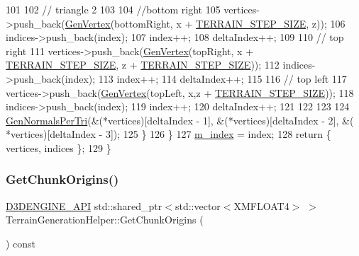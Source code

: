 \begin{DoxyCode}
101 
102             \textcolor{comment}{// triangle 2}
103 
104             \textcolor{comment}{//bottom right}
105             vertices->push\_back(\mbox{\hyperlink{class_terrain_generation_helper_a3ef70fded2f8984224915ec14c1238a7}{GenVertex}}(bottomRight, x + 
      \mbox{\hyperlink{_terrain_generation_helper_8h_ad04a251ab3e1323474688977de1579e4}{TERRAIN\_STEP\_SIZE}}, z));
106             indices->push\_back(index);
107             index++;
108             deltaIndex++;
109             
110             \textcolor{comment}{// top right}
111             vertices->push\_back(\mbox{\hyperlink{class_terrain_generation_helper_a3ef70fded2f8984224915ec14c1238a7}{GenVertex}}(topRight, x + 
      \mbox{\hyperlink{_terrain_generation_helper_8h_ad04a251ab3e1323474688977de1579e4}{TERRAIN\_STEP\_SIZE}}, z + \mbox{\hyperlink{_terrain_generation_helper_8h_ad04a251ab3e1323474688977de1579e4}{TERRAIN\_STEP\_SIZE}}));
112             indices->push\_back(index);
113             index++;
114             deltaIndex++;
115 
116             \textcolor{comment}{// top left}
117             vertices->push\_back(\mbox{\hyperlink{class_terrain_generation_helper_a3ef70fded2f8984224915ec14c1238a7}{GenVertex}}(topLeft, x,z + 
      \mbox{\hyperlink{_terrain_generation_helper_8h_ad04a251ab3e1323474688977de1579e4}{TERRAIN\_STEP\_SIZE}}));
118             indices->push\_back(index);
119             index++;
120             deltaIndex++;
121 
122             
123 
124             \mbox{\hyperlink{class_terrain_generation_helper_a1989d3e408497b90675799ded98feaf1}{GenNormalsPerTri}}(&(*vertices)[deltaIndex - 1], &(*vertices)[deltaIndex - 2], &(
      *vertices)[deltaIndex - 3]);
125         \}
126     \}
127     \mbox{\hyperlink{class_terrain_generation_helper_a225a9ea3488c08d2565efee5461c4d00}{m\_index}} = index;
128     \textcolor{keywordflow}{return} \{ vertices, indices \};
129 \}
\end{DoxyCode}
\mbox{\label{class_terrain_generation_helper_a86694a8373034cce99eb4e624c559163}} 
\subsubsection{\texorpdfstring{Get\+Chunk\+Origins()}{GetChunkOrigins()}}
{\footnotesize\ttfamily \mbox{\hyperlink{stdafx_8h_a8ee2d990c5dfba7794dd2b60741d7722}{D3\+D\+E\+N\+G\+I\+N\+E\+\_\+\+A\+PI}} std\+::shared\+\_\+ptr$<$std\+::vector$<$X\+M\+F\+L\+O\+A\+T4$>$ $>$ Terrain\+Generation\+Helper\+::\+Get\+Chunk\+Origins (\begin{DoxyParamCaption}{ }\end{DoxyParamCaption}) const\hspace{0.3cm}{\ttfamily [inline]}}



